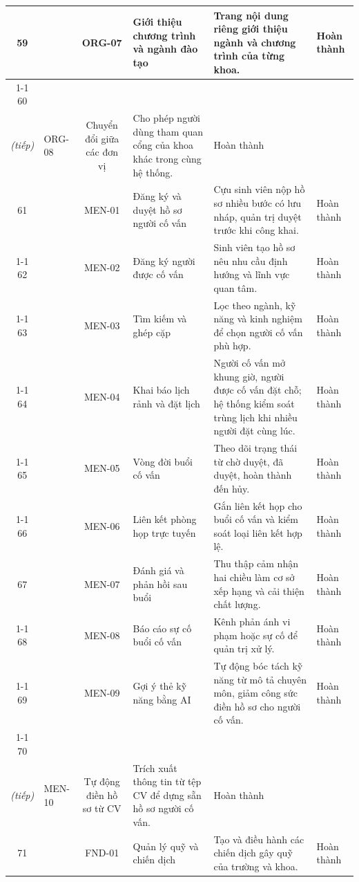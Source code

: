 \documentclass[12pt,a4paper,oneside]{report}
\begin{document}
\begin{landscape}
\begin{longtable}{|c|>{\raggedright\arraybackslash}p{3.1cm}|c|>{\raggedright\arraybackslash}p{4.6cm}|>{\raggedright\arraybackslash}p{8.4cm}|>{\raggedright\arraybackslash}p{2.4cm}|}
\hline
59 &  & ORG-07 & Giới thiệu chương trình và ngành đào tạo & Trang nội dung riêng giới thiệu ngành và chương trình của từng khoa. & Hoàn thành \\
\cline{1-1}\cline{3-6}
60 & \multirow{-2}{2.4cm}{\textbf{Tổ chức và đa đơn vị\\\textit{(tiếp)}}} & ORG-08 & Chuyển đổi giữa các đơn vị & Cho phép người dùng tham quan cổng của khoa khác trong cùng hệ thống. & Hoàn thành \\
\hline
61 &  & MEN-01 & Đăng ký và duyệt hồ sơ người cố vấn & Cựu sinh viên nộp hồ sơ nhiều bước có lưu nháp, quản trị duyệt trước khi công khai. & Hoàn thành \\
\cline{1-1}\cline{3-6}
62 &  & MEN-02 & Đăng ký người được cố vấn & Sinh viên tạo hồ sơ nêu nhu cầu định hướng và lĩnh vực quan tâm. & Hoàn thành \\
\cline{1-1}\cline{3-6}
63 &  & MEN-03 & Tìm kiếm và ghép cặp & Lọc theo ngành, kỹ năng và kinh nghiệm để chọn người cố vấn phù hợp. & Hoàn thành \\
\cline{1-1}\cline{3-6}
64 &  & MEN-04 & Khai báo lịch rảnh và đặt lịch & Người cố vấn mở khung giờ, người được cố vấn đặt chỗ; hệ thống kiểm soát trùng lịch khi nhiều người đặt cùng lúc. & Hoàn thành \\
\cline{1-1}\cline{3-6}
65 &  & MEN-05 & Vòng đời buổi cố vấn & Theo dõi trạng thái từ chờ duyệt, đã duyệt, hoàn thành đến hủy. & Hoàn thành \\
\cline{1-1}\cline{3-6}
66 & \multirow{-6}{2.4cm}{\textbf{Cố vấn}} & MEN-06 & Liên kết phòng họp trực tuyến & Gắn liên kết họp cho buổi cố vấn và kiểm soát loại liên kết hợp lệ. & Hoàn thành \\
\hline
67 &  & MEN-07 & Đánh giá và phản hồi sau buổi & Thu thập cảm nhận hai chiều làm cơ sở xếp hạng và cải thiện chất lượng. & Hoàn thành \\
\cline{1-1}\cline{3-6}
68 &  & MEN-08 & Báo cáo sự cố buổi cố vấn & Kênh phản ánh vi phạm hoặc sự cố để quản trị xử lý. & Hoàn thành \\
\cline{1-1}\cline{3-6}
69 &  & MEN-09 & Gợi ý thẻ kỹ năng bằng AI & Tự động bóc tách kỹ năng từ mô tả chuyên môn, giảm công sức điền hồ sơ cho người cố vấn. & Hoàn thành \\
\cline{1-1}\cline{3-6}
70 & \multirow{-4}{2.4cm}{\textbf{Cố vấn\\\textit{(tiếp)}}} & MEN-10 & Tự động điền hồ sơ từ CV & Trích xuất thông tin từ tệp CV để dựng sẵn hồ sơ người cố vấn. & Hoàn thành \\
\hline
71 &  & FND-01 & Quản lý quỹ và chiến dịch & Tạo và điều hành các chiến dịch gây quỹ của trường và khoa. & Hoàn thành \\

\end{longtable}
\end{landscape}
\end{document}
